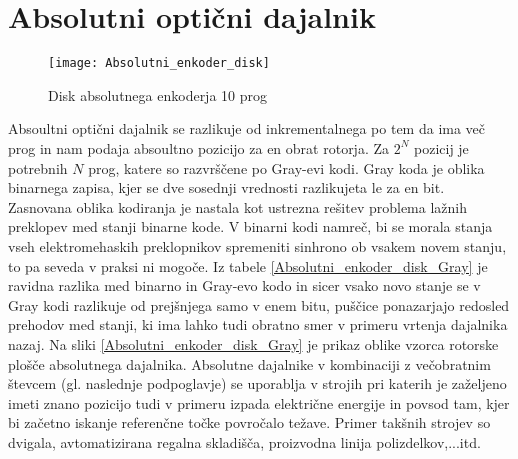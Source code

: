 \documentclass[a4paper,twoside,openright,12pt]{book}
\begin{document}
\section{Absolutni optični dajalnik}
\begin{figure}[h]
	\centering
	\texttt{[image: Absolutni\_enkoder\_disk]}
	\caption{\label{EnkoderSinCos} Disk absolutnega enkoderja 10 prog}
\end{figure}
Absoultni optični dajalnik se razlikuje od inkrementalnega po tem da ima več prog in nam podaja absoultno pozicijo za en obrat rotorja. Za $2^N$ pozicij je potrebnih $N$ prog, katere so razvrščene po Gray-evi kodi. Gray koda je oblika binarnega zapisa, kjer se dve sosednji vrednosti razlikujeta le za en bit. Zasnovana oblika kodiranja je nastala kot ustrezna rešitev problema lažnih preklopev med stanji binarne kode. V binarni kodi namreč, bi se morala stanja vseh elektromehaskih preklopnikov spremeniti sinhrono ob vsakem novem stanju, to pa seveda v praksi ni mogoče. Iz tabele \ref{Absolutni_enkoder_disk_Gray} je ravidna razlika med binarno in Gray-evo kodo in sicer vsako novo stanje se v Gray kodi razlikuje od prejšnjega samo v enem bitu, puščice ponazarjajo redosled prehodov med stanji, ki ima lahko tudi obratno smer v primeru vrtenja dajalnika nazaj. Na sliki \ref{Absolutni_enkoder_disk_Gray} je prikaz oblike vzorca rotorske plošče absolutnega dajalnika. Absolutne dajalnike v kombinaciji z večobratnim števcem (gl. naslednje podpoglavje) se uporablja v strojih pri katerih je zaželjeno imeti znano pozicijo tudi v primeru izpada električne energije in povsod tam, kjer bi začetno iskanje referenčne točke povročalo težave. Primer takšnih strojev so dvigala, avtomatizirana regalna skladišča, proizvodna linija polizdelkov,...itd.
\end{document}
